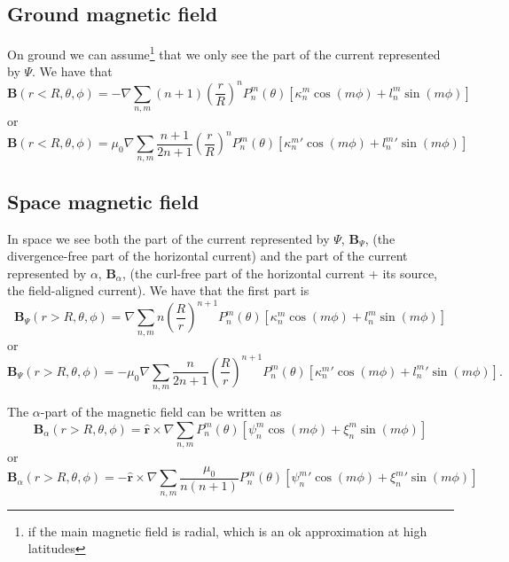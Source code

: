 \documentclass[]{article}
\begin{document}
\subsection*{Ground magnetic field}
On ground we can assume\footnote{if the main magnetic field is radial, which is an ok approximation at high latitudes} that we only see the part of the current represented by $\Psi$. We have that
\begin{equation}
\mathbf{B}(r < R, \theta, \phi) = -\nabla \sum_{n,m}(n+1)\left(\frac{r}{R}\right)^n P_n^m(\theta)[\kappa_n^m\cos(m\phi) + l_n^m \sin(m\phi)]
\end{equation}
or
\begin{equation}
\mathbf{B}(r < R, \theta, \phi) = \mu_0\nabla \sum_{n,m}\frac{n+1}{2n+1}\left(\frac{r}{R}\right)^n P_n^m(\theta)[\kappa_n^m'\cos(m\phi) + l_n^m' \sin(m\phi)]
\end{equation}

\subsection*{Space magnetic field}
In space we see both the part of the current represented by $\Psi$, $\mathbf{B}_\Psi$, (the divergence-free part of the horizontal current) and the part of the current represented by $\alpha$, $\mathbf{B}_\alpha$, (the curl-free part of the horizontal current + its source, the field-aligned current). We have that the first part is 
\begin{equation}
\mathbf{B}_\Psi(r > R, \theta, \phi) = \nabla \sum_{n,m}n\left(\frac{R}{r}\right)^{n+1} P_n^m(\theta)[\kappa_n^m\cos(m\phi) + l_n^m \sin(m\phi)]
\end{equation}
or
\begin{equation}
\mathbf{B}_\Psi(r > R, \theta, \phi) = -\mu_0\nabla \sum_{n,m}\frac{n}{2n+1}\left(\frac{R}{r}\right)^{n+1} P_n^m(\theta)[\kappa_n^m'\cos(m\phi) + l_n^m' \sin(m\phi)].
\end{equation}

The $\alpha$-part of the magnetic field can be written as
\begin{equation}
\mathbf{B}_\alpha(r > R, \theta, \phi) = \hat{\mathbf{r}} \times \nabla \sum_{n,m}P_n^m(\theta)[\psi_n^m\cos(m\phi) + \xi_n^m\sin(m\phi)]
\end{equation}
or
\begin{equation}
\mathbf{B}_\alpha(r > R, \theta, \phi) = -\hat{\mathbf{r}} \times \nabla \sum_{n,m}\frac{\mu_0}{n(n+1)}P_n^m(\theta)[\psi_n^m'\cos(m\phi) + \xi_n^m'\sin(m\phi)]
\end{equation}
\end{document}
